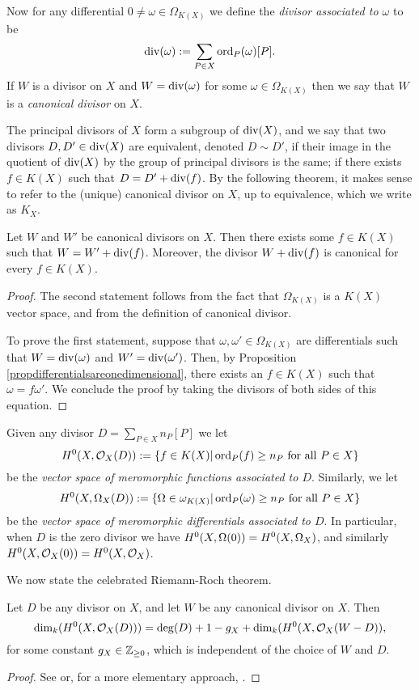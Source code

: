 Now for any differential $0 \neq \omega \in \Omega_{K(X)}$ we define the \emph{divisor associated to $\omega$} to be
    \[
    \operatorname{div}(\omega) := \sum_{P \in X} \operatorname{ord}_P(\omega)[P].
    \]
If $W$ is a divisor on $X$ and $W = \operatorname{div}(\omega)$ for some $ \omega \in \Omega_{K(X)}$ then we say that $W$ is a \emph{canonical divisor} on $X$.

The principal divisors of $X$ form a subgroup of $\operatorname{div}(X)$, and we say that two divisors $D, D' \in \operatorname{div}(X)$ are equivalent, denoted $D \sim D'$, if their image in the quotient of $\operatorname{div}(X)$ by the group of principal divisors is the same; \ie if there exists $f \in K(X)$ such that $ D = D' + \operatorname{div}(f)$.
By the following theorem, it makes sense to refer to the (unique) canonical divisor on $X$, up to equivalence, which we write as $K_X$.

    \begin{thm}
    Let $W$ and $W'$ be canonical divisors on $X$.
    Then there exists some $f \in K(X)$ such that $W = W' + \operatorname{div}(f)$.
    Moreover, the divisor $W + \operatorname{div}(f)$ is canonical for every $f \in K(X)$.
    \end{thm}
    \begin{proof}
    The second statement follows from the fact that $\Omega_{K(X)}$ is a $K(X)$ vector space, and from the definition of canonical divisor.


    To prove the first statement, suppose that $\omega, \omega' \in \Omega_{K(X)}$ are differentials such that $W = \operatorname{div}(\omega)$ and $W' = \operatorname{div}(\omega')$.
    Then, by Proposition \ref{propdifferentialsareonedimensional}, there exists an $f \in K(X)$ such that $\omega = f \omega'$.
    We conclude the proof by taking the divisors of both sides of this equation.
    \end{proof}

Given any divisor $D = \sum_{P \in X} n_P[P]$ we let
    \[
    H^0(X,{\cal O}_X(D)) : = \{ f \in K(X) | \operatorname{ord}_P(f) \geq n_P\ \text{for all}\ P \in X\}
    \]
be the \emph{vector space of meromorphic functions associated to $D$}.
Similarly, we let 
    \[
    H^0(X,\Omega_X(D)) :  = \{ \Omega \in \omega_{K(X)} | \ord_P(\omega) \geq n_P \ \text{for all} \ P \in X\}
    \]
be the \emph{vector space of meromorphic differentials associated to $D$}.
In particular, when $D$ is the zero divisor we have $H^0(X,\Omega(0)) = {H^0(X,\Omega_X)}$, and similarly $H^0(X,{\cal O}_X(0)) = H^0(X,{\cal O}_X)$.

We now state the celebrated Riemann-Roch theorem.

    \begin{thm}\label{theoremriemannroch}
    Let $D$ be any divisor on $X$, and let $W$ be any canonical divisor on $X$.
    Then
        \[
        \dim_k(H^0(X,{\cal O}_X(D))) = \deg(D) + 1 - g_X + \dim_k(H^0(X,{\cal O}_X(W-D)), 
        \]
    for some constant $g_X \in {\mathbb Z}_{\geq 0}$, which is independent of the choice of $W$ and $D$.
    \end{thm}
    \begin{proof}
    See \cite[Chap.\ IV, \S 1, Thm.\ 1.3]{hart} or, for a more elementary approach, \cite[Chap.\ 8, \S 6]{fulton}.
    \end{proof}

